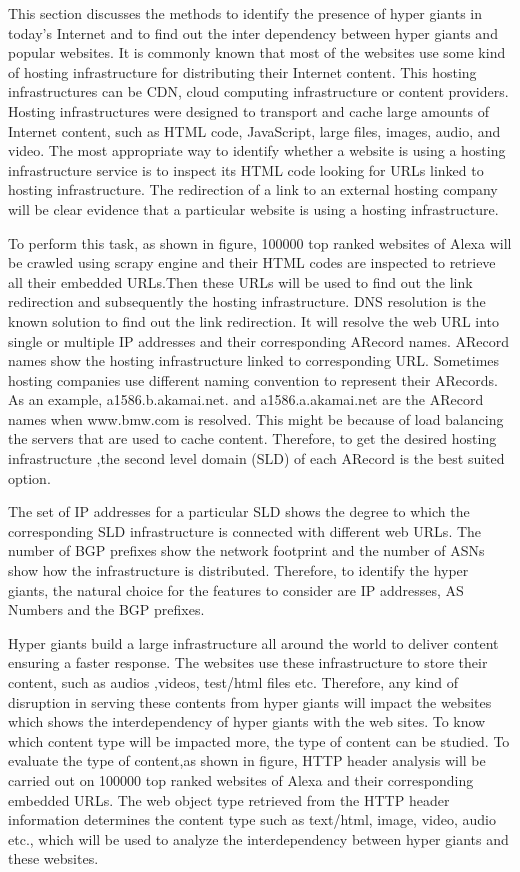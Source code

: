 This section discusses the methods to identify the presence of hyper giants in today's Internet and to find out the inter dependency between hyper giants and popular websites. It is commonly known that most of the websites use some kind of hosting infrastructure for distributing their Internet content. This hosting infrastructures can be CDN, cloud computing infrastructure or content providers. Hosting infrastructures were designed to transport and cache large amounts of Internet content, such as HTML code, JavaScript, large files, images, audio, and video. The most appropriate way to identify whether a website is using a hosting infrastructure service is to inspect its HTML code looking for URLs linked to hosting infrastructure. The redirection of a link to an external hosting company will be clear evidence that a particular website is using a hosting infrastructure. 

To perform this task, as shown in figure, 100000 top ranked websites of Alexa will be crawled using scrapy engine and their HTML codes  are inspected to retrieve all their embedded URLs.Then these URLs will be used to find out the link redirection and subsequently the hosting infrastructure. DNS resolution is the known solution to find out the link redirection. It will resolve the web URL into single or multiple  IP addresses and their corresponding ARecord names. ARecord names show the hosting infrastructure linked to corresponding URL. Sometimes hosting companies use different naming convention to represent their ARecords. As an example, a1586.b.akamai.net. and a1586.a.akamai.net are the ARecord names when www.bmw.com is resolved. This might be because of load balancing the servers that are used to cache content. Therefore, to get the desired hosting infrastructure ,the second level domain (SLD) of each ARecord is the best suited option.

The set of IP addresses for a particular SLD shows the degree to which the corresponding SLD infrastructure is connected with different web URLs. The number of BGP prefixes show the network footprint and the number of ASNs show how the infrastructure is distributed. Therefore, to identify the hyper giants, the natural choice for the features to consider are IP addresses, AS Numbers and the BGP prefixes.

Hyper giants build a large infrastructure all around the world to deliver content ensuring a faster response. The websites use these infrastructure to store their content, such as audios ,videos, test/html files etc. Therefore, any kind of disruption in serving these contents from hyper giants will impact the websites which shows the interdependency of hyper giants with the web sites. To know which content type will be impacted more, the type of content can be studied. To evaluate the type of content,as shown in figure, HTTP header analysis will be carried out on 100000 top ranked websites of Alexa and their corresponding embedded URLs. The web object type retrieved from the HTTP header information determines the content type such as text/html, image, video, audio etc., which will be used to analyze the interdependency between hyper giants and these websites.

